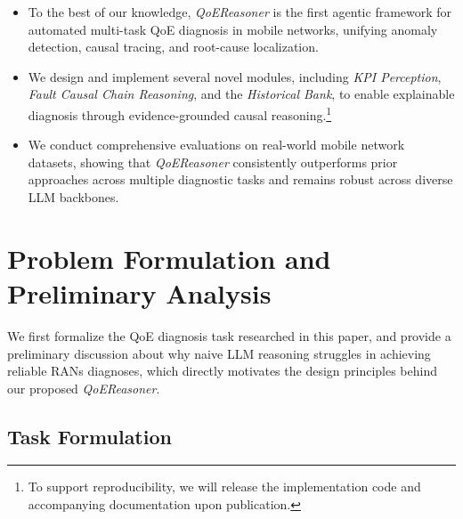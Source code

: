 \documentclass[sigconf,10pt]{acmart} %
\begin{document}
\begin{itemize}[itemsep=0em, topsep=0em, leftmargin=1em]

\item To the best of our knowledge, \textit{QoEReasoner} is the first agentic framework for automated multi-task QoE diagnosis in mobile networks, unifying anomaly detection, causal tracing, and root-cause localization.

\item We design and implement several novel modules, including \emph{KPI Perception}, \emph{Fault Causal Chain Reasoning}, and the \emph{Historical Bank}, to enable explainable diagnosis through evidence-grounded causal reasoning.\footnote{To support reproducibility, we will release the implementation code and accompanying documentation upon publication.}

\item We conduct comprehensive evaluations on real-world mobile network datasets, showing that \textit{QoEReasoner} consistently outperforms prior approaches across multiple diagnostic tasks and remains robust across diverse LLM backbones.

\end{itemize}

\section{Problem Formulation and Preliminary Analysis}
We first formalize the QoE diagnosis task researched in this paper, and provide a preliminary discussion about why naive LLM reasoning struggles in achieving reliable RANs diagnoses, which directly motivates the design principles behind our proposed \textit{QoEReasoner}.

\subsection{Task Formulation}
\label{sec:task formu}
\end{document}
